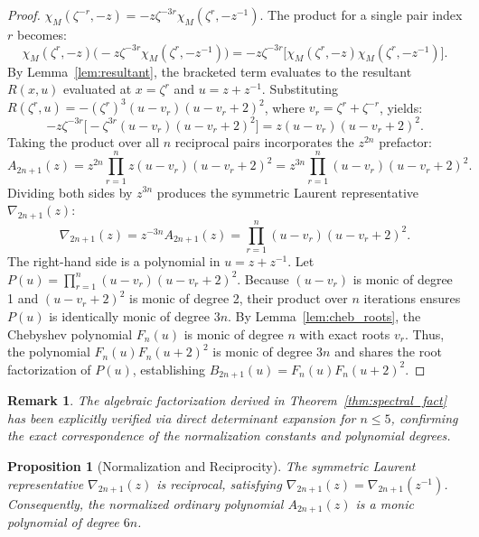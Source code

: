 \documentclass[11pt]{article}
\newtheorem{proposition}[theorem]{Proposition}
\newtheorem{remark}[theorem]{Remark}
\begin{document}
\begin{proof}
$\chi_M(\zeta^{-r}, -z) = -z\zeta^{-3r}\chi_M(\zeta^r, -z^{-1})$. The product for a single pair index $r$ becomes:
\begin{equation*}
\chi_M(\zeta^r, -z) \Big( -z\zeta^{-3r}\chi_M(\zeta^r, -z^{-1}) \Big) = -z\zeta^{-3r} \Big[ \chi_M(\zeta^r, -z)\chi_M(\zeta^r, -z^{-1}) \Big].
\end{equation*}
By Lemma~\ref{lem:resultant}, the bracketed term evaluates to the resultant $R(x, u)$ evaluated at $x = \zeta^r$ and $u = z + z^{-1}$. Substituting $R(\zeta^r, u) = -(\zeta^r)^3 (u - v_r)(u - v_r + 2)^2$, where $v_r = \zeta^r + \zeta^{-r}$, yields:
\begin{equation*}
-z\zeta^{-3r} \Big[ -\zeta^{3r} (u - v_r)(u - v_r + 2)^2 \Big] = z(u - v_r)(u - v_r + 2)^2.
\end{equation*}
Taking the product over all $n$ reciprocal pairs incorporates the $z^{2n}$ prefactor:
\begin{equation*}
A_{2n+1}(z) = z^{2n} \prod_{r=1}^n z(u - v_r)(u - v_r + 2)^2 = z^{3n} \prod_{r=1}^n (u - v_r)(u - v_r + 2)^2.
\end{equation*}
Dividing both sides by $z^{3n}$ produces the symmetric Laurent representative $\nabla_{2n+1}(z)$:
\begin{equation*}
\nabla_{2n+1}(z) = z^{-3n} A_{2n+1}(z) = \prod_{r=1}^n (u - v_r)(u - v_r + 2)^2.
\end{equation*}
The right-hand side is a polynomial in $u = z+z^{-1}$. Let $P(u) = \prod_{r=1}^n (u - v_r)(u - v_r + 2)^2$. Because $(u - v_r)$ is monic of degree 1 and $(u - v_r + 2)^2$ is monic of degree 2, their product over $n$ iterations ensures $P(u)$ is identically monic of degree $3n$. By Lemma~\ref{lem:cheb_roots}, the Chebyshev polynomial $F_n(u)$ is monic of degree $n$ with exact roots $v_r$. Thus, the polynomial $F_n(u)F_n(u+2)^2$ is monic of degree $3n$ and shares the root factorization of $P(u)$, establishing $B_{2n+1}(u) = F_n(u)F_n(u+2)^2$.
\end{proof}

\begin{remark}
The algebraic factorization derived in Theorem~\ref{thm:spectral_fact} has been explicitly verified via direct determinant expansion for $n \le 5$, confirming the exact correspondence of the normalization constants and polynomial degrees.
\end{remark}

\begin{proposition}[Normalization and Reciprocity]\label{prop:normalization}
The symmetric Laurent representative \newline $\nabla_{2n+1}(z)$ is reciprocal, satisfying $\nabla_{2n+1}(z) = \nabla_{2n+1}(z^{-1})$. Consequently, the normalized ordinary polynomial $A_{2n+1}(z)$ is a monic polynomial of degree $6n$.
\end{proposition}
\end{document}
